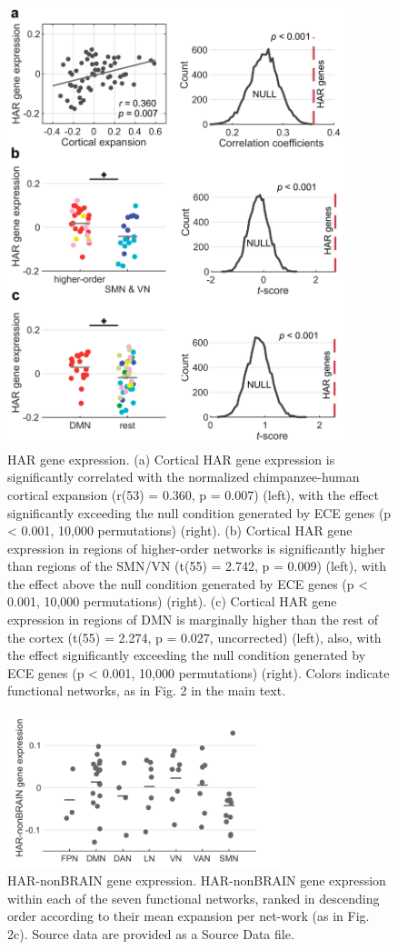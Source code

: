 \begin{refsection}
\begin{figure}[H]
    \centering
    \includegraphics[width=10cm]{images/harFigS1.png}
    \caption{HAR gene expression. (a) Cortical HAR gene expression is significantly correlated with the normalized chimpanzee-human cortical expansion (r(53) = 0.360, p = 0.007) (left), with the effect significantly exceeding the null condition generated by ECE genes (p < 0.001, 10,000 permutations) (right). (b) Cortical HAR gene expression in regions of higher-order networks is significantly higher than regions of the SMN/VN (t(55) = 2.742, p = 0.009) (left), with the effect above the null condition generated by ECE genes (p < 0.001, 10,000 permutations) (right). (c) Cortical HAR gene expression in regions of DMN is marginally higher than the rest of the cortex (t(55) = 2.274, p = 0.027, uncorrected) (left), also, with the effect significantly exceeding the null condition generated by ECE genes (p < 0.001, 10,000 permutations) (right). Colors indicate functional networks, as in Fig. 2 in the main text.}
    \label{harFigs1}
\end{figure}


\begin{figure}[H]
    \centering
    \includegraphics[width=8cm]{images/harFigS2.png}
    \caption{HAR-nonBRAIN gene expression. HAR-nonBRAIN gene expression within each of the seven functional networks, ranked in descending order according to their mean expansion per net-work (as in Fig. 2c). Source data are provided as a Source Data file.}
    \label{harFigs2}
\end{figure}


\end{refsection}
